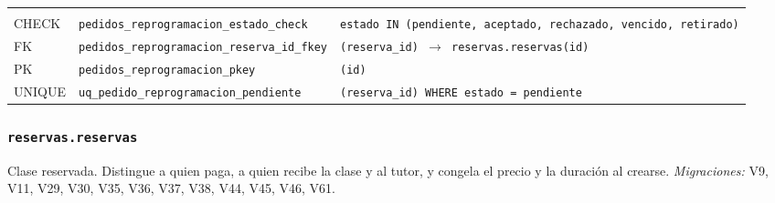 {\small
\begin{xltabular}{\textwidth}{@{}>{\raggedright\arraybackslash}p{1.7cm} >{\raggedright\arraybackslash}p{4.6cm} L@{}}
    \toprule
     &  &  \\
    \midrule
    \endfirsthead
    \toprule
     &  &  \\
    \midrule
    \endhead
    \bottomrule
    \endfoot
    CHECK & \texttt{pedidos\_\allowbreak{}reprogramacion\_\allowbreak{}estado\_\allowbreak{}check} & \texttt{estado IN (\allowbreak{}\textquotesingle{}pendiente\textquotesingle{},\allowbreak{} \textquotesingle{}aceptado\textquotesingle{},\allowbreak{} \textquotesingle{}rechazado\textquotesingle{},\allowbreak{} \textquotesingle{}vencido\textquotesingle{},\allowbreak{} \textquotesingle{}retirado\textquotesingle{})} \\
    FK & \texttt{pedidos\_\allowbreak{}reprogramacion\_\allowbreak{}reserva\_\allowbreak{}id\_\allowbreak{}fkey} & \texttt{(\allowbreak{}reserva\_\allowbreak{}id) $\rightarrow$ reservas.reservas(\allowbreak{}id)} \\
    PK & \texttt{pedidos\_\allowbreak{}reprogramacion\_\allowbreak{}pkey} & \texttt{(\allowbreak{}id)} \\
    UNIQUE & \texttt{uq\_\allowbreak{}pedido\_\allowbreak{}reprogramacion\_\allowbreak{}pendiente} & \texttt{(\allowbreak{}reserva\_\allowbreak{}id) WHERE estado = \textquotesingle{}pendiente\textquotesingle{}} \\
\end{xltabular}
}

\subsubsection{\texorpdfstring{\texttt{reservas.reservas}}{reservas.reservas}}\label{dd:reservas.reservas}

Clase reservada. Distingue a quien paga, a quien recibe la clase y al tutor, y congela el precio y la duración al crearse. \emph{Migraciones:} V9, V11, V29, V30, V35, V36, V37, V38, V44, V45, V46, V61.

